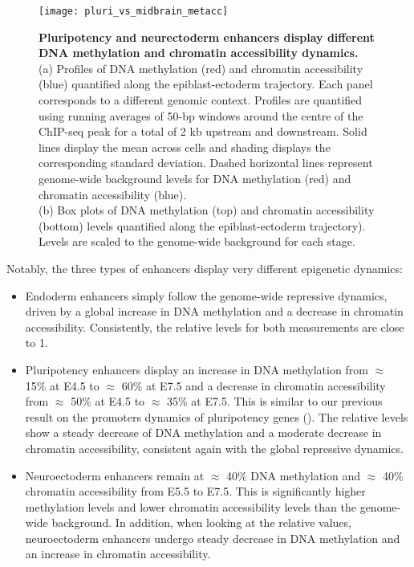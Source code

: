 \begin{figure}[H]
	\centering
	\texttt{[image: pluri\_vs\_midbrain\_metacc]}
	\caption[]{
	\textbf{Pluripotency and neurectoderm enhancers display different DNA methylation and chromatin accessibility dynamics.} \\
	(a) Profiles of DNA methylation (red) and chromatin accessibility (blue) quantified along the epiblast-ectoderm trajectory. Each panel corresponds to a different genomic context. Profiles are quantified using running averages of 50-bp windows around the centre of the ChIP-seq peak for a total of 2 kb upstream and downstream. Solid lines display the mean across cells and shading displays the corresponding standard deviation. Dashed horizontal lines represent genome-wide background levels for DNA methylation (red) and chromatin accessibility (blue). \\
	(b)	Box plots of DNA methylation (top) and chromatin accessibility (bottom) levels quantified along the epiblast-ectoderm trajectory). Levels are scaled to the genome-wide background for each stage.
	}
	\label{fig:pluri_vs_midbrain_metacc}
\end{figure}

Notably, the three types of enhancers display very different epigenetic dynamics:
\begin{itemize}
	\item Endoderm enhancers simply follow the genome-wide repressive dynamics, driven by a global increase in DNA methylation and a decrease in chromatin accessibility. Consistently, the relative levels for both measurements are close to 1.

	\item Pluripotency enhancers display an increase in DNA methylation from $\approx$ 15\% at E4.5 to $\approx$ 60\% at E7.5 and a decrease in chromatin accessibility from $\approx$ 50\% at E4.5 to $\approx$ 35\% at E7.5. This is similar to our previous result on the promoters dynamics of pluripotency genes (). The relative levels show a steady decrease of DNA methylation and a moderate decrease in chromatin accessibility, consistent again with the global repressive dynamics.

	\item Neuroectoderm enhancers remain at $\approx$ 40\% DNA methylation and $\approx$ 40\% chromatin accessibility from E5.5 to E7.5. This is significantly higher methylation levels and lower chromatin accessibility levels than the genome-wide background. In addition, when looking at the relative values, neuroectoderm enhancers undergo steady decrease in DNA methylation and an increase in chromatin accessibility.

\end{itemize}

